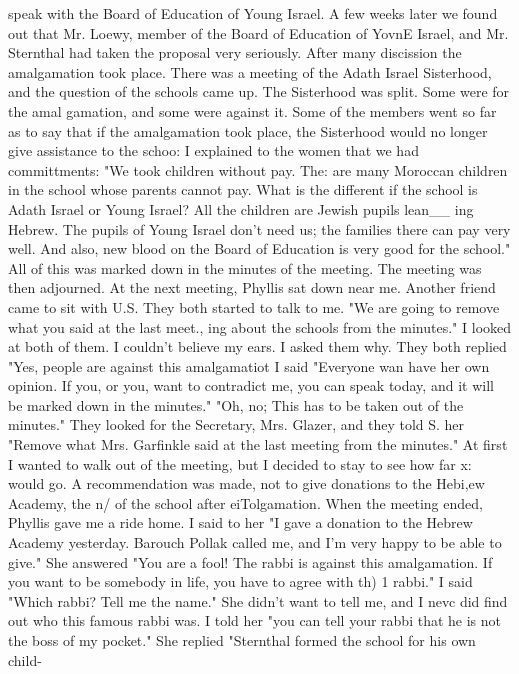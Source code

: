 {speak with the Board of Education of Young Israel. 
A few weeks later we found out that Mr. Loewy, member of the Board of Education of YovnE 
Israel, and Mr. Sternthal had taken the proposal very seriously. After many discission 
the amalgamation took place. There was a meeting of the Adath Israel Sisterhood, and 
the question of the schools came up. The Sisterhood was split. Some were for the amal 
gamation, and some were against it. Some of the members went so far as to say that if 
the amalgamation took place, the Sisterhood would no longer give assistance to the schoo: 
I explained to the women that we had committments: "We took children without pay. The: 
are many Moroccan children in the school whose parents cannot pay. What is the different 
if the school is Adath Israel or Young Israel? All the children are Jewish pupils lean__ 
ing Hebrew. The pupils of Young Israel don't need us; the families there can pay very 
well. And also, new blood on the Board of Education is very good for the school." All 
of this was marked down in the minutes of the meeting. The meeting was then adjourned. 
At the next meeting, Phyllis sat down near me. Another friend came to sit with U.S. 
They both started to talk to me. "We are going to remove what you said at the last meet., 
ing about the schools from the minutes." I looked at both of them. I couldn't believe 
my ears. I asked them why. They both replied "Yes, people are against this amalgamatiot 
I said "Everyone wan have her own opinion. If you, or you, want to contradict me, you 
can speak today, and it will be marked down in the minutes." "Oh, no; This has to be 
taken out of the minutes." They looked for the Secretary, Mrs. Glazer, and they told 
S. 
her "Remove what Mrs. Garfinkle said at the last meeting from the minutes." 
At first I wanted to walk out of the meeting, but I decided to stay to see how far x: 
would go. A recommendation was made, not to give donations to the Hebi,ew Academy, the n/ 
of the school after eiTolgamation. When the meeting ended, Phyllis gave me a ride home. 
I said to her "I gave a donation to the Hebrew Academy yesterday. Barouch Pollak called 
me, and I'm very happy to be able to give." She answered "You are a fool! The rabbi is 
against this amalgamation. If you want to be somebody in life, you have to agree with th) 
1 
rabbi." I said "Which rabbi? Tell me the name." She didn't want to tell me, and I nevc 
did find out who this famous rabbi was. I told her "you can tell your rabbi that he is 
not the boss of my pocket." She replied "Sternthal formed the school for his own child-
}
